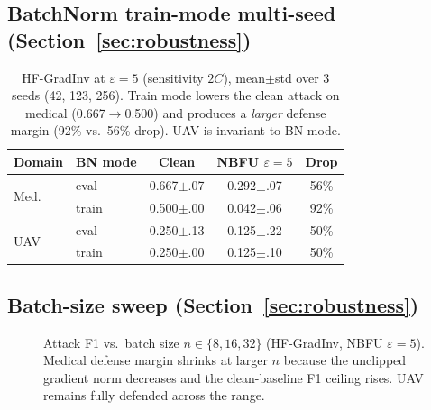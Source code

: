 \documentclass[11pt]{article}
\begin{document}
\subsection{BatchNorm train-mode multi-seed (Section~\ref{sec:robustness})}
\begin{table}[h]
\centering
\small
\setlength{\tabcolsep}{3pt}
\begin{tabular}{llccc}
\toprule
Domain & BN mode & Clean & NBFU $\varepsilon{=}5$ & Drop \\
\midrule
\multirow{2}{*}{Med.}
 & eval  & 0.667$\pm$.07 & 0.292$\pm$.07 & 56\% \\
 & train & 0.500$\pm$.00 & 0.042$\pm$.06 & 92\% \\
\midrule
\multirow{2}{*}{UAV}
 & eval  & 0.250$\pm$.13 & 0.125$\pm$.22 & 50\% \\
 & train & 0.250$\pm$.00 & 0.125$\pm$.10 & 50\% \\
\bottomrule
\end{tabular}
\caption{HF-GradInv at $\varepsilon{=}5$ (sensitivity $2C$), mean$\pm$std over 3 seeds (42, 123, 256). Train mode lowers the clean attack on medical (0.667$\to$0.500) and produces a \emph{larger} defense margin (92\% vs.\ 56\% drop). UAV is invariant to BN mode.}
\label{tab:bntrain}
\end{table}

\subsection{Batch-size sweep (Section~\ref{sec:robustness})}
\begin{figure}[h]
\centering

\caption{Attack F1 vs.\ batch size $n \in \{8, 16, 32\}$ (HF-GradInv, NBFU $\varepsilon{=}5$). Medical defense margin shrinks at larger $n$ because the unclipped gradient norm decreases and the clean-baseline F1 ceiling rises. UAV remains fully defended across the range.}
\label{fig:batch}
\end{figure}
\end{document}
